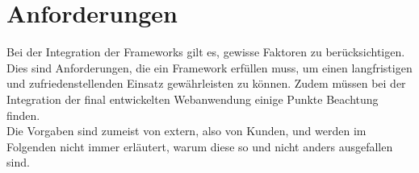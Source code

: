 \section{Anforderungen}
\label{sec:anforderungen}

Bei der Integration der Frameworks gilt es, gewisse Faktoren zu berücksichtigen. Dies sind Anforderungen, die ein Framework erfüllen muss, um einen langfristigen und zufriedenstellenden Einsatz gewährleisten zu können. Zudem müssen bei der Integration der final entwickelten Webanwendung einige Punkte Beachtung finden. \\
Die Vorgaben sind zumeist von extern, also von Kunden, und werden im Folgenden nicht immer erläutert, warum diese so und nicht anders ausgefallen sind. 







%
%



